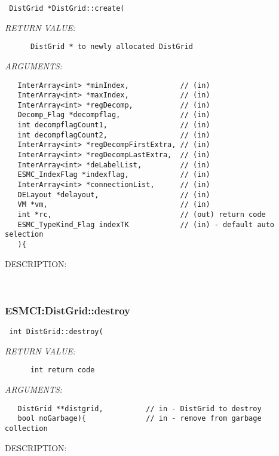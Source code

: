   
\begin{verbatim} DistGrid *DistGrid::create(\end{verbatim}{\em RETURN VALUE:}
\begin{verbatim}      DistGrid * to newly allocated DistGrid\end{verbatim}{\em ARGUMENTS:}
\begin{verbatim}   InterArray<int> *minIndex,            // (in)
   InterArray<int> *maxIndex,            // (in)
   InterArray<int> *regDecomp,           // (in)
   Decomp_Flag *decompflag,              // (in)
   int decompflagCount1,                 // (in)
   int decompflagCount2,                 // (in)
   InterArray<int> *regDecompFirstExtra, // (in)
   InterArray<int> *regDecompLastExtra,  // (in)
   InterArray<int> *deLabelList,         // (in)
   ESMC_IndexFlag *indexflag,            // (in)
   InterArray<int> *connectionList,      // (in)
   DELayout *delayout,                   // (in)
   VM *vm,                               // (in)
   int *rc,                              // (out) return code
   ESMC_TypeKind_Flag indexTK            // (in) - default auto selection
   ){\end{verbatim}
{\sf DESCRIPTION:\\ }


   
 
\mbox{}\hrulefill\
 
\subsubsection [ESMCI:DistGrid::destroy] {ESMCI:DistGrid::destroy}


  
\begin{verbatim} int DistGrid::destroy(\end{verbatim}{\em RETURN VALUE:}
\begin{verbatim}      int return code\end{verbatim}{\em ARGUMENTS:}
\begin{verbatim}   DistGrid **distgrid,          // in - DistGrid to destroy
   bool noGarbage){              // in - remove from garbage collection\end{verbatim}
{\sf DESCRIPTION:\\ }


   
 
